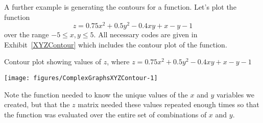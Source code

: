 A further example is generating the contours for a function. Let's plot the function 
$$z=0.75x^2 + 0.5y^2 -0.4xy + x - y -1$$ 
over the range $-5\leq x,y \leq 5$. All necessary codes are given in Exhibit~\ref{XYZContour} which includes the contour plot of the function. 
\begin{exhibit} 
\begin{center} 
\caption{Contour plot showing values of $z$, where $z=0.75x^2 + 0.5y^2 -0.4xy + x - y -1$} 
\label{XYZContour} 
\begin{knitrout}
\color{fgcolor}\begin{kframe}
\begin{alltt}
\hlstd{> }\hlkwb{=}\hlstd{((}\hlopt{:}\hlstd{)}\hlopt{-}\hlstd{)}\hlopt{/}
\hlstd{> }\hlkwb{=}\hlstd{((}\hlopt{:}\hlstd{)}\hlopt{-}\hlstd{)}\hlopt{/}
\hlstd{> }\hlkwb{=} \hlstd{)}
\hlstd{> }\hlkwb{=} \hlstd{=}\hlstd{)}
\hlstd{> }\hlkwb{=}\hlstd{(}\hlopt{*}\hlopt{^} \hlopt{+} \hlopt{*}\hlopt{^}\hlopt{-}\hlopt{*}\hlopt{*}\hlopt{+}\hlopt{-}\hlopt{-}\hlstd{,} \hlstd{=}\hlstd{)}
\hlstd{> }
\end{alltt}
\end{kframe}
\texttt{[image: figures/ComplexGraphsXYZContour-1]} 

\end{knitrout}
\end{center} 
\end{exhibit} 
 
Note the  function needed to know the unique values of the $x$ and $y$ variables we created, but that the $z$ matrix needed these values repeated enough times so that the function was evaluated over the entire set of combinations of $x$ and $y$. 
 
 
 


